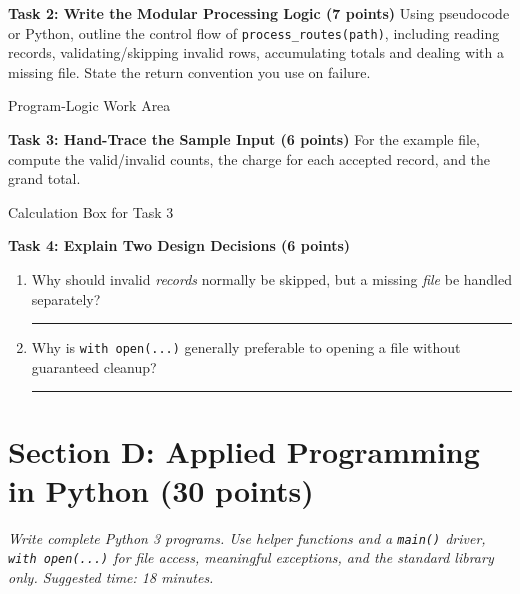 \documentclass[11pt,a4paper]{article}
\begin{document}
\textbf{Task 2: Write the Modular Processing Logic (7 points)}
Using pseudocode or Python, outline the control flow of \texttt{process\_routes(path)}, including reading records, validating/skipping invalid rows, accumulating totals and dealing with a missing file. State the return convention you use on failure.
\begin{answerbox}[height=4.0cm]{Program-Logic Work Area}\end{answerbox}
\textbf{Task 3: Hand-Trace the Sample Input (6 points)}
For the example file, compute the valid/invalid counts, the charge for each accepted record, and the grand total.
\begin{answerbox}[height=2.6cm]{Calculation Box for Task 3}\end{answerbox}
\textbf{Task 4: Explain Two Design Decisions (6 points)}
\begin{enumerate}[label=\alph*),leftmargin=1.8em,itemsep=2pt]
\item Why should invalid \emph{records} normally be skipped, but a missing \emph{file} be handled separately?\\[-1pt]\rule{\linewidth}{0.4pt}
\item Why is \texttt{with open(...)} generally preferable to opening a file without guaranteed cleanup?\\[-1pt]\rule{\linewidth}{0.4pt}
\end{enumerate}
\newpage
\section*{Section D: Applied Programming in Python \hfill \normalsize\normalfont(30 points)}
\textit{Write complete Python 3 programs. Use helper functions and a \texttt{main()} driver, \texttt{with open(...)} for file access, meaningful exceptions, and the standard library only. Suggested time: 18 minutes.}
\end{document}
